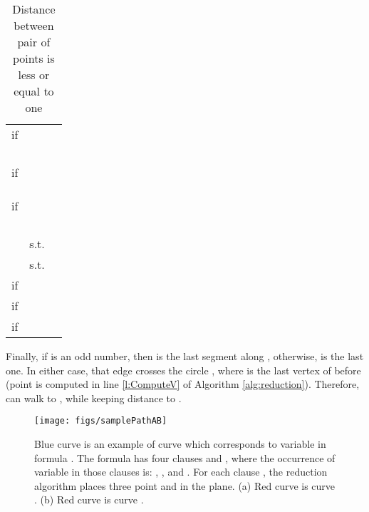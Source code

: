 \documentclass[12pt]{dalthesis}
\def\favoritefont{\bfseries \sffamily}
\def\QED{\ensuremath{{\Box}}}
\def\markatright#1{\leavevmode\unskip\nobreak\quad\hspace*{\fill}{#1}}
\newenvironment{proof}
	{\begin{trivlist}\item[\hskip\labelsep{\favoritefont Proof:}]}
	{\markatright{\QED}\end{trivlist}}
\newcommand{\qed}{}
\begin{document}
\begin{proof}
\begin{table}[t]
\begin{tabular}{ r | l | l  }
\hline
if  &      & \\
&  & \\
&  & \\
&  &  \\
&   & \\




if  &  			  & \\
 &  &  \\
 &  &  \\
 &   &  \\






if  &  	  & \\
&  & \\
 & &  \\
 & &  \\
&   &  \\





\hline

	&   s.t.   & \\
	&  	 s.t.   & \\
\hline









 if   &  &  \\
   if   &  & \\
   if   &  & \\

\end{tabular}
\caption{Distance between pair of points is less or equal to one}
\label{tab:PathA}
\end{table}





Finally, if  is an odd number, then  
 is the last segment along , otherwise, 
 is the last one. In 
either case, 
that edge crosses  the circle , where  is the last vertex of 
 before  (point  is computed in line \ref{l:ComputeV} of 
Algorithm \ref{alg:reduction}). Therefore, 
  can walk to , while keeping distance  to . 


\qed
\end{proof}




\begin{figure}[t]
	\centering
	\texttt{[image: figs/samplePathAB]}
	\caption{
Blue curve is an example of curve  which corresponds to variable  in  formula . The formula has four clauses  and ,	 where the occurrence of variable   in those clauses is:
, ,  and .  
For each clause , the reduction algorithm places three point  and  in the plane. (a) Red curve is curve . 
 (b) Red curve is curve .  }
	\label{fig:pathAExample}
\end{figure}
\end{document}
